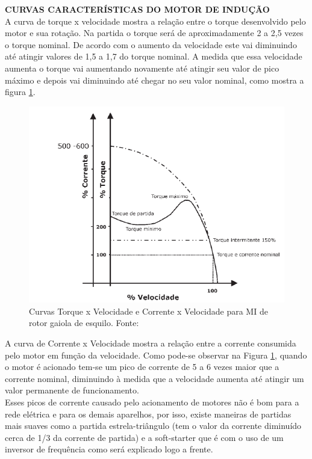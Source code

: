 \textbf{CURVAS CARACTERÍSTICAS DO MOTOR DE INDUÇÃO}\\

A curva de torque x velocidade mostra a relação entre o torque desenvolvido pelo motor e sua rotação. Na partida o torque será de aproximadamente 2 a 2,5 vezes o torque nominal. De acordo com o aumento da velocidade este vai diminuindo até atingir valores de 1,5 a 1,7 do torque nominal.\cite{WEG} A medida que essa velocidade aumenta o torque vai aumentando novamente até atingir seu valor de pico máximo e depois vai diminuindo até chegar no seu 
valor nominal, como mostra a figura \ref{fig:curvas_motor}.

\begin{figure}[h!]
\centering
\includegraphics[scale=0.8]{figuras/grafico_motor.png}
\caption{Curvas Torque x Velocidade e Corrente x Velocidade para MI de rotor gaiola de esquilo. Fonte:\cite{WEG}}
\label{fig:curvas_motor}
\end{figure}

A curva de Corrente x Velocidade mostra a relação entre a corrente consumida pelo motor em função da velocidade. Como pode-se observar na Figura \ref{fig:curvas_motor}, quando o motor é acionado tem-se um pico de corrente de 5 a 6 vezes maior que a corrente nominal, diminuindo à medida que a velocidade aumenta até atingir um valor permanente de funcionamento.\\

\text Esses picos de corrente causado pelo acionamento de motores não é bom para a rede elétrica e para os demais aparelhos, por isso, existe maneiras de partidas mais suaves como a partida estrela-triângulo (tem o valor da corrente diminuído cerca de 1/3 da corrente de partida) e a soft-starter que é com o uso de um inversor de frequência como será explicado logo a frente.\\

